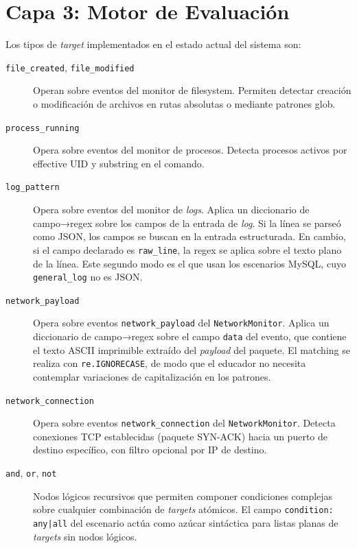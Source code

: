\section{Capa 3: Motor de Evaluación}


Los tipos de \textit{target} implementados en el estado actual del sistema son:

\begin{description}
    \item[\texttt{file\_created}, \texttt{file\_modified}] Operan sobre eventos
    del monitor de filesystem. Permiten detectar creación o modificación de
    archivos en rutas absolutas o mediante patrones glob.

    \item[\texttt{process\_running}] Opera sobre eventos del monitor de
    procesos. Detecta procesos activos por effective UID y substring en el
    comando.

    \item[\texttt{log\_pattern}] Opera sobre eventos del monitor de
    \textit{logs}. Aplica un diccionario de campo→regex sobre los campos de la
    entrada de \textit{log}. Si la línea se parseó como JSON, los campos se
    buscan en la entrada estructurada. En cambio, si el campo declarado es
    \texttt{raw\_line}, la regex se aplica sobre el texto plano de la línea.
    Este segundo modo es el que usan los escenarios MySQL, cuyo
    \texttt{general\_log} no es JSON.

    \item[\texttt{network\_payload}] Opera sobre eventos
    \texttt{network\_payload} del \texttt{NetworkMonitor}. Aplica un diccionario
    de campo→regex sobre el campo \texttt{data} del evento, que contiene el
    texto ASCII imprimible extraído del \textit{payload} del paquete. El
    matching se realiza con \texttt{re.IGNORECASE}, de modo que el educador no
    necesita contemplar variaciones de capitalización en los patrones.

    \item[\texttt{network\_connection}] Opera sobre eventos
    \texttt{network\_connection} del \texttt{NetworkMonitor}. Detecta conexiones
    TCP establecidas (paquete SYN-ACK) hacia un puerto de destino específico,
    con filtro opcional por IP de destino.

    \item[\texttt{and}, \texttt{or}, \texttt{not}] Nodos lógicos recursivos que
    permiten componer condiciones complejas sobre cualquier combinación de
    \textit{targets} atómicos. El campo \texttt{condition: any|all} del
    escenario actúa como azúcar sintáctica para listas planas de
    \textit{targets} sin nodos lógicos.
\end{description}

